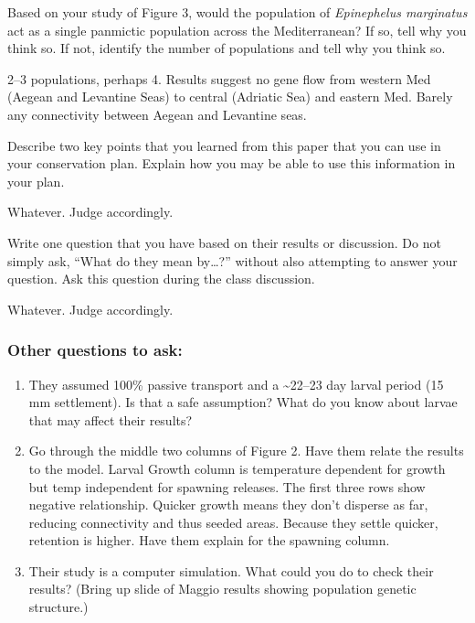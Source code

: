 \documentclass[12pt, addpoints]{exam}
\newcommand*\AnswerBox[2]{%
    \parbox[t][#1]{0.92\textwidth}{%
    \begin{solution}#2\end{solution}}
}
\begin{document}
\begin{questions}
%

\question[3]
Based on your study of Figure 3, would the population of \textit{Epinephelus marginatus} act as a single panmictic population across the Mediterranean? If so, tell why you think so. If not, identify the number of populations and tell why you think so.

\AnswerBox{4\baselineskip}{%
2--3 populations, perhaps 4. Results suggest no gene flow from western Med (Aegean and Levantine Seas) to central (Adriatic Sea) and eastern Med. Barely any connectivity between Aegean and Levantine seas.
}

\question[5]
Describe two key points that you learned from this paper that you can use in your conservation plan. Explain how you may be able to use this information in your plan.

\AnswerBox{4\baselineskip}{%
Whatever. Judge accordingly.
}

\question[3]
Write one question that you have based on their results or discussion. Do not simply ask, ``What do they mean by\dots?'' without also attempting to answer your question.  Ask this question during the class discussion.

\AnswerBox{4\baselineskip}{%
Whatever. Judge accordingly.
}

\end{questions}

\ifprintanswers

\newpage

\subsubsection*{Other questions to ask:}

\begin{enumerate}[label=\alph*.]

	\item They assumed 100\% passive transport and a \textasciitilde22–23 day larval period (15 mm settlement). Is that a safe assumption? What do you know about larvae that may affect their results?
	
	\item Go through the middle two columns of Figure 2. Have them relate the results to the model. Larval Growth column is temperature dependent for growth but temp independent for spawning releases. The first three rows show negative relationship. Quicker growth means they don't disperse as far, reducing connectivity and thus seeded areas. Because they settle quicker, retention is higher. Have them explain for the spawning column. 

	\item Their study is a computer simulation. What could you do to check their results? (Bring up slide of Maggio results showing population genetic structure.)
	
\end{enumerate}

\fi
\end{document}
